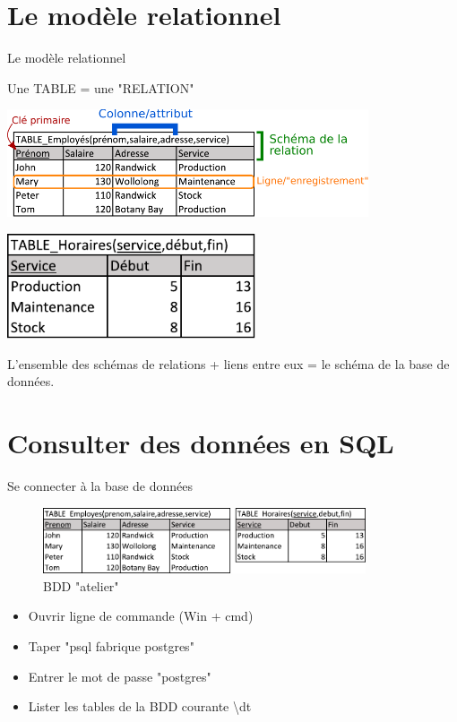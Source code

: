 \documentclass[xetex,dvipsnames]{beamer}
\begin{document}
\section{Le modèle relationnel}
\begin{frame}{Le modèle relationnel}
		\begin{center}
			Une TABLE = une "RELATION"
	    \end{center}
			\vspace{0.3em}
	    	\includegraphics[width=0.8\textwidth]{./figures/relation.pdf}
	    	\vspace{0.3em}
	    	\pause
	    	\vspace*{0.3em}
\begin{flushright}
	    	\includegraphics[width=0.55\textwidth]{./figures/relation2.pdf}
\end{flushright}
 			\begin{center}
			L'ensemble des schémas de relations + liens entre eux = le schéma de la base de données.
	    \end{center}
\end{frame}


\section{Consulter des données en SQL}
\begin{frame}{Se connecter à la base de données}
 	\begin{center}
	    	\begin{figure}
	    	\includegraphics[width=0.85\textwidth]{./figures/BDDatelier.pdf}
	    	\caption{BDD "atelier"}
	    	\end{figure}
	\end{center}
	\begin{itemize}
		\item Ouvrir ligne de commande (Win + cmd)
		\item Taper "psql fabrique postgres"
		\item Entrer le mot de passe "postgres"
		\item Lister les tables de la BDD courante \textbackslash dt
	\end{itemize}		
\end{frame}
\end{document}

